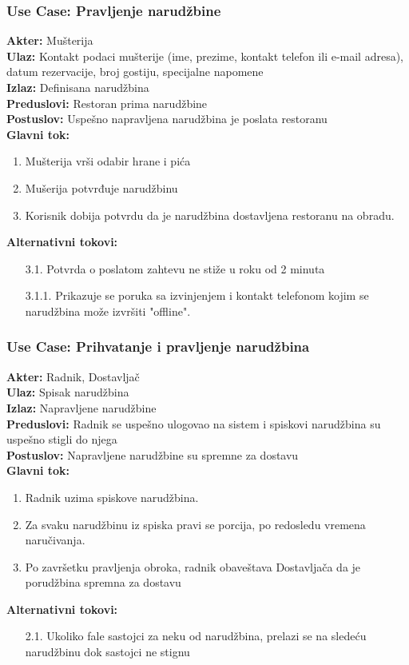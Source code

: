 \documentclass{article}
\begin{document}
\subsubsection{\textbf{Use Case}: Pravljenje narudžbine}
\textbf{Akter:} Mušterija\\
\textbf{Ulaz:} Kontakt podaci mušterije (ime, prezime, kontakt telefon ili e-mail adresa), datum rezervacije, broj gostiju, specijalne napomene\\
\textbf{Izlaz:} Definisana narudžbina\\
\textbf{Preduslovi:} Restoran prima narudžbine\\
\textbf{Postuslov:} Uspešno napravljena narudžbina je poslata restoranu\\
\textbf{Glavni tok:}
\begin{enumerate}
\item Mušterija vrši odabir hrane i pića
\item Mušerija potvrđuje narudžbinu
\item Korisnik dobija potvrdu da je narudžbina dostavljena restoranu na obradu.\\
\end{enumerate}
\textbf{Alternativni tokovi:} \\
\begin{itemize}
\item [3.1.] Potvrda o poslatom zahtevu ne stiže u roku od 2 minuta
\item [3.1.1.] Prikazuje se poruka sa izvinjenjem i kontakt telefonom kojim se narudžbina može izvršiti "offline".
\end{itemize}


\subsubsection{\textbf{Use Case}: Prihvatanje i pravljenje narudžbina}
\textbf{Akter:} Radnik, Dostavljač\\
\textbf{Ulaz:} Spisak narudžbina\\
\textbf{Izlaz:} Napravljene narudžbine\\
\textbf{Preduslovi:} Radnik se uspešno ulogovao na sistem i spiskovi narudžbina su uspešno stigli do njega\\
\textbf{Postuslov:}  Napravljene narudžbine su spremne za dostavu\\
\textbf{Glavni tok:}
\begin{enumerate}
\item Radnik uzima spiskove narudžbina.
\item Za svaku narudžbinu iz spiska pravi se porcija, po redosledu vremena naručivanja.
\item Po završetku pravljenja obroka, radnik obaveštava Dostavljača da je porudžbina spremna za dostavu 
\end{enumerate}
\textbf{Alternativni tokovi:}\\
\begin{itemize}
\item [2.1.] Ukoliko  fale sastojci za neku od narudžbina, prelazi se na sledeću narudžbinu dok sastojci ne stignu
\end{itemize}
       
\end{document}
